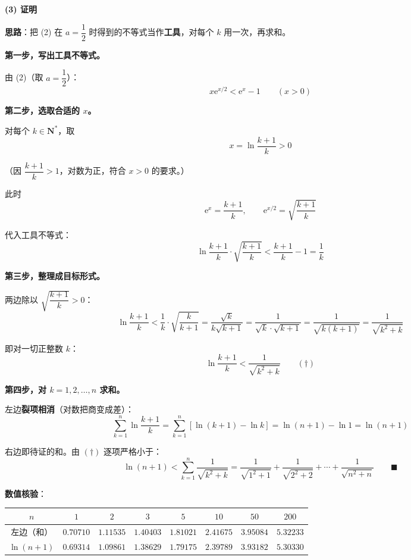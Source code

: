 \par\medskip

\textbf{(3) 证明}

\textbf{思路}：把 (2) 在 $a=\dfrac12$ 时得到的不等式当作\textbf{工具}，对每个 $k$ 用一次，再求和。

\textbf{第一步，写出工具不等式。}

由 (2)（取 $a=\dfrac12$）：
\[x\mathrm e^{x/2}<\mathrm e^{x}-1\qquad(x>0)\]

\textbf{第二步，选取合适的 $x$。}

对每个 $k\in\mathbf N^{*}$，取
\[x=\ln\frac{k+1}k>0\]

（因 $\dfrac{k+1}k>1$，对数为正，符合 $x>0$ 的要求。）

此时
\[\mathrm e^{x}=\frac{k+1}k,\qquad\mathrm e^{x/2}=\sqrt{\frac{k+1}k}\]

代入工具不等式：
\[\ln\frac{k+1}k\cdot\sqrt{\frac{k+1}k}<\frac{k+1}k-1=\frac1k\]

\textbf{第三步，整理成目标形式。}

两边除以 $\sqrt{\dfrac{k+1}k}>0$：
\[\ln\frac{k+1}k<\frac1k\cdot\sqrt{\frac k{k+1}}=\frac{\sqrt k}{k\sqrt{k+1}}=\frac1{\sqrt k\cdot\sqrt{k+1}}=\frac1{\sqrt{k(k+1)}}=\frac1{\sqrt{k^{2}+k}}\]

即对一切正整数 $k$：
\[\ln\frac{k+1}k<\frac1{\sqrt{k^{2}+k}}\qquad(\dagger)\]

\textbf{第四步，对 $k=1,2,\dots,n$ 求和。}

左边\textbf{裂项相消}（对数把商变成差）：
\[\sum_{k=1}^{n}\ln\frac{k+1}k=\sum_{k=1}^{n}\left[\ln(k+1)-\ln k\right]=\ln(n+1)-\ln1=\ln(n+1)\]

右边即待证的和。由 $(\dagger)$ 逐项严格小于：
\[\ln(n+1)<\sum_{k=1}^{n}\frac1{\sqrt{k^{2}+k}}=\frac1{\sqrt{1^{2}+1}}+\frac1{\sqrt{2^{2}+2}}+\cdots+\frac1{\sqrt{n^{2}+n}}\qquad\blacksquare\]

\textbf{数值核验}：

\begin{center}
\begingroup\setlength{\tabcolsep}{4pt}
\begin{tabular}{cccccccc}
\toprule
$n$ & $1$ & $2$ & $3$ & $5$ & $10$ & $50$ & $200$ \\
\midrule
左边（和） & $0.70710$ & $1.11535$ & $1.40403$ & $1.81021$ & $2.41675$ & $3.95084$ & $5.32233$ \\
$\ln(n+1)$ & $0.69314$ & $1.09861$ & $1.38629$ & $1.79175$ & $2.39789$ & $3.93182$ & $5.30330$ \\
\bottomrule
\end{tabular}
\endgroup
\end{center}

